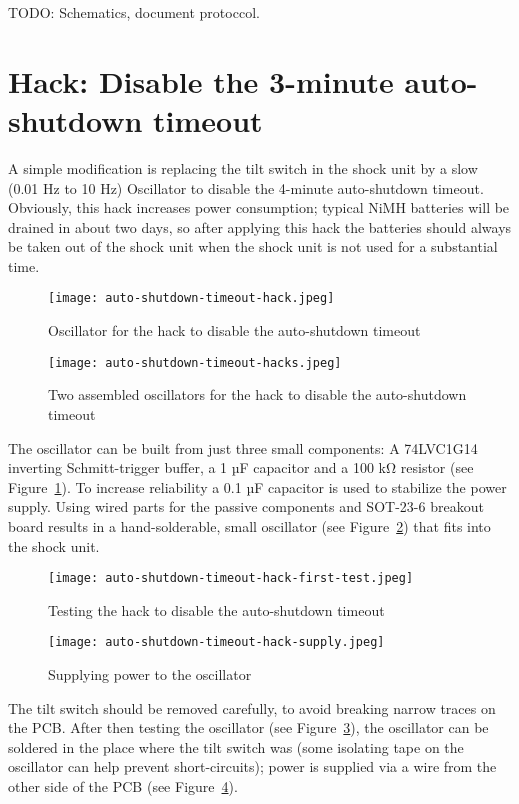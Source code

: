 \documentclass[a4paper]{article}
\begin{document}
TODO: Schematics, document protoccol.

\section{Hack: Disable the 3-minute auto-shutdown timeout}

A simple modification is replacing the tilt switch in the shock unit by a slow (0.01 Hz to 10 Hz) Oscillator to disable the 4-minute auto-shutdown timeout. Obviously, this hack increases power consumption; typical NiMH batteries will be drained in about two days, so after applying this hack the batteries should always be taken out of the shock unit when the shock unit is not used for a substantial time.

\begin{figure}
	\centerline{\texttt{[image: auto-shutdown-timeout-hack.jpeg]}}
	\caption{\label{auto-shutdown-timeout-hack}Oscillator for the hack to disable the auto-shutdown timeout}
\end{figure}

\begin{figure}
	\centerline{\texttt{[image: auto-shutdown-timeout-hacks.jpeg]}}
	\caption{\label{auto-shutdown-timeout-hacks}Two assembled oscillators for the hack to disable the auto-shutdown timeout}
\end{figure}

The oscillator can be built from just three small components: A 74LVC1G14 inverting Schmitt-trigger buffer, a 1 µF capacitor and a 100 k\si{\ohm} resistor (see Figure~\ref{auto-shutdown-timeout-hack}). To increase reliability a 0.1 µF capacitor is used to stabilize the power supply. Using wired parts for the passive components and SOT-23-6 breakout board results in a hand-solderable, small oscillator (see Figure~\ref{auto-shutdown-timeout-hacks}) that fits into the shock unit.

\begin{figure}
	\centerline{\texttt{[image: auto-shutdown-timeout-hack-first-test.jpeg]}}
	\caption{\label{auto-shutdown-timeout-hack-first-test}Testing the hack to disable the auto-shutdown timeout}
\end{figure}

\begin{figure}
	\centerline{\texttt{[image: auto-shutdown-timeout-hack-supply.jpeg]}}
	\caption{\label{auto-shutdown-timeout-hack-supply}Supplying power to the oscillator}
\end{figure}

The tilt switch should be removed carefully, to avoid breaking narrow traces on the PCB.
After then testing the oscillator (see Figure~\ref{auto-shutdown-timeout-hack-first-test}), the oscillator can be soldered in the place where the tilt switch was (some isolating tape on the oscillator can help prevent short-circuits); power is supplied via a wire from the other side of the PCB (see Figure~\ref{auto-shutdown-timeout-hack-supply}).
\end{document}
